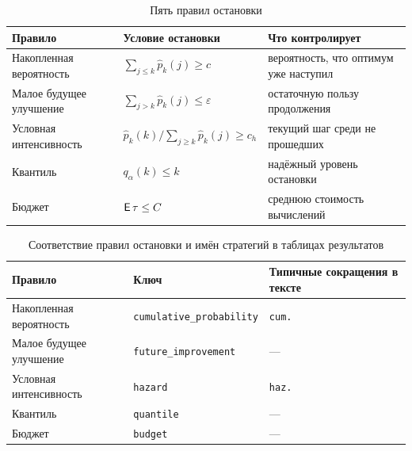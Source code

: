 \begin{table}[H]
\centering
\caption{Пять правил остановки}
\label{tab:stopping_rules}
\begin{tabularx}{\textwidth}{|l|Y|Y|}
\hline
Правило & Условие остановки & Что контролирует \\
\hline
Накопленная вероятность & \(\sum_{j\le k}\widehat p_k(j)\ge c\) & вероятность, что оптимум уже
наступил \\
\hline
Малое будущее улучшение & \(\sum_{j>k}\widehat p_k(j)\le\varepsilon\) & остаточную пользу
продолжения \\
\hline
Условная интенсивность & \(\widehat p_k(k)/\sum_{j\ge k}\widehat p_k(j)\ge c_h\) & текущий шаг
среди не прошедших \\
\hline
Квантиль & \(q_\alpha(k)\le k\) & надёжный уровень остановки \\
\hline
Бюджет & \(\operatorname{\mathsf{E}}\tau\le C\) & среднюю стоимость вычислений \\
\hline
\end{tabularx}
\end{table}

\begin{table}[H]
\centering
\caption{Соответствие правил остановки и имён стратегий в таблицах результатов}
\label{tab:stopping_strategy_keys}
\begin{tabularx}{\textwidth}{|l|l|X|}
\hline
Правило & Ключ & Типичные сокращения в тексте \\
\hline
Накопленная вероятность & \texttt{cumulative\_probability} & \texttt{cum.} \\
\hline
Малое будущее улучшение & \texttt{future\_improvement} & --- \\
\hline
Условная интенсивность & \texttt{hazard} & \texttt{haz.} \\
\hline
Квантиль & \texttt{quantile} & --- \\
\hline
Бюджет & \texttt{budget} & --- \\
\hline
\end{tabularx}
\end{table}

